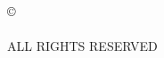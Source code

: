 \clearpage
\thispagestyle{plain}
\null
\vfill
\begin{center}
\copyright\ \CopyrightYear\\
\ThesisAuthor\\
ALL RIGHTS RESERVED
\end{center}
\vspace{1\baselineskip}
\null